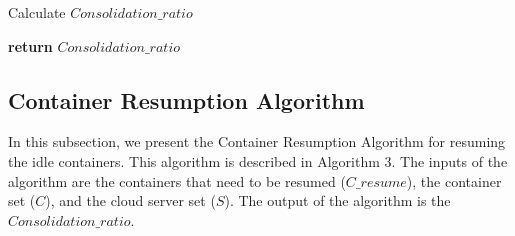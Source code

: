 \begin{algorithm}
\begin{algorithmic}[1]
\State Calculate \begin{math}Consolidation\_ratio \end{math}
    \EndIf

    \EndWhile  \label{loop}
\State \textbf{return} \begin{math}Consolidation\_ratio \end{math}
\EndProcedure

\end{algorithmic}
\end{algorithm}
\subsection{Container Resumption Algorithm}
In this subsection, we present the Container Resumption
Algorithm for resuming the idle containers. This algorithm
is described in Algorithm 3. The inputs of the algorithm
are the containers that need to be resumed (\begin{math}C\_resume \end{math}), the
container set (\begin{math}C\end{math}), and the cloud server set (\begin{math}S\end{math}). The output of
the algorithm is the \begin{math}Consolidation\_ratio \end{math}.



